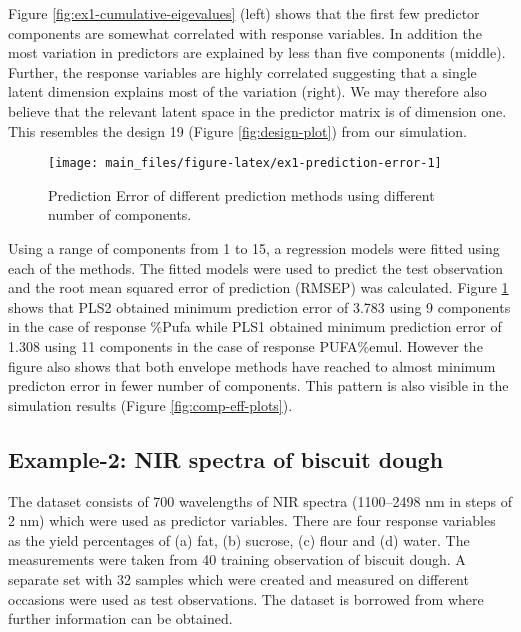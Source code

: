 \documentclass[12pt,3p,authoryear]{elsarticle}
\begin{document}
Figure \ref{fig:ex1-cumulative-eigevalues} (left) shows that the first
few predictor components are somewhat correlated with response
variables. In addition the most variation in predictors are explained by
less than five components (middle). Further, the response variables are
highly correlated suggesting that a single latent dimension explains
most of the variation (right). We may therefore also believe that the
relevant latent space in the predictor matrix is of dimension one. This
resembles the design 19 (Figure \ref{fig:design-plot}) from our
simulation.

\begin{figure}[!htb]
\texttt{[image: main\_files/figure-latex/ex1-prediction-error-1]} \caption{Prediction Error of different prediction methods using different number of components.}\label{fig:ex1-prediction-error}
\end{figure}

Using a range of components from 1 to 15, a regression models were
fitted using each of the methods. The fitted models were used to predict
the test observation and the root mean squared error of prediction
(RMSEP) was calculated. Figure \ref{fig:ex1-prediction-error} shows that
PLS2 obtained minimum prediction error of 3.783 using 9 components in
the case of response \%Pufa while PLS1 obtained minimum prediction error
of 1.308 using 11 components in the case of response PUFA\%emul. However
the figure also shows that both envelope methods have reached to almost
minimum predicton error in fewer number of components. This pattern is
also visible in the simulation results (Figure
\ref{fig:comp-eff-plots}).

\subsection{Example-2: NIR spectra of biscuit
dough}\label{example-2-nir-spectra-of-biscuit-dough}

The dataset consists of 700 wavelengths of NIR spectra (1100--2498 nm in
steps of 2 nm) which were used as predictor variables. There are four
response variables as the yield percentages of (a) fat, (b) sucrose, (c)
flour and (d) water. The measurements were taken from 40 training
observation of biscuit dough. A separate set with 32 samples which were
created and measured on different occasions were used as test
observations. The dataset is borrowed from \citet{indahl2005twist} where
further information can be obtained.
\end{document}
